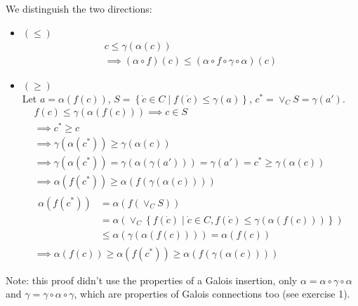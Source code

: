 \begin{exercise}
\begin{itemize}
        We distinguish the two directions:
        \begin{itemize}
            \item $(\leq)$
            \begin{gather*}
                c \leq \gamma(\alpha(c)) \\
                \implies (\alpha \circ f)(c) \leq (\alpha \circ f \circ \gamma \circ \alpha)(c)
            \end{gather*}
            \item $(\geq)$ \\
            Let $a = \alpha(f(c))$, $S = \left\{\dot{c} \in C \mid f(\dot{c}) \leq \gamma(a)\right\}$, $c^* = \vee_C S = \gamma(a')$.
            \begin{gather*}
                f(c) \leq \gamma(\alpha(f(c))) \implies c \in S \\
                \implies c^* \geq c \\
                \implies \gamma(\alpha(c^*)) \geq \gamma(\alpha(c)) \\
                \implies \gamma(\alpha(c^*)) = \gamma(\alpha(\gamma(a'))) = \gamma(a') = c^* \geq \gamma(\alpha(c)) \\
                \implies \alpha(f(c^*)) \geq \alpha(f(\gamma(\alpha(c)))) \\
                \begin{aligned}
                    \alpha(f(c^*)) &= \alpha(f(\vee_C S)) \\
                    &= \alpha(\vee_C \left\{f(\dot{c}) \mid \dot{c} \in C, f(\dot{c}) \leq \gamma(\alpha(f(c)))\right\}) \\
                    &\leq \alpha(\gamma(\alpha(f(c)))) = \alpha(f(c))
                \end{aligned} \\
                \implies \alpha(f(c)) \geq \alpha(f(c^*)) \geq \alpha(f(\gamma(\alpha(c))))
            \end{gather*}
        \end{itemize}
    \end{itemize}
    Note: this proof didn't use the properties of a Galois insertion, only $\alpha = \alpha \circ \gamma \circ \alpha$ and $\gamma = \gamma \circ \alpha \circ \gamma$, which are properties of Galois connections too (see exercise 1).
\end{exercise}
